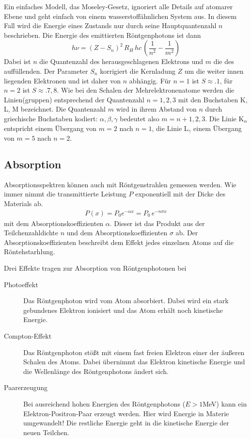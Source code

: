 Ein einfaches Modell, das Moseley-Gesetz, ignoriert alle Details auf atomarer Ebene und geht einfach von einem wasserstoffähnlichen System aus. In diesem Fall wird die Energie eines Zustands nur durch seine Hauptquantenzahl $n$ beschrieben. Die Energie des emittierten Röntgenphotons ist dann 
\begin{equation}
    h \nu = (Z - S_n)^2 \, R_H \, hc \, \left(  \frac{1}{n^2} - \frac{1}{m^2} \right)
\end{equation}
Dabei ist $n$ die Quantenzahl des herausgeschlagenen Elektrons und $m$ die des auffüllenden. Der Parameter $S_n$ korrigiert die Kernladung $Z$ um die weiter innen liegenden Elektronen und ist daher von $n$ abhängig. Für $n=1$ ist $S \approx. 1$, für $n=2$ ist $S \approx. 7,8$.
Wie bei den Schalen der Mehrelektronenatome werden die Linien(gruppen) entsprechend der Quantenzahl $n = 1, 2, 3$ mit den Buchstaben K, L, M bezeichnet. Die Quantenzahl $m$ wird in ihrem Abstand von $n$ durch griechische Buchstaben kodiert: $\alpha, \beta, \gamma$ bedeutet also $m=n + 1,2,3$. Die Linie K$_\alpha$ entspricht einem Übergang von $m=2$ nach $n=1$, die Linie L$_\gamma$ einem Übergang von $m=5$ nach $n=2$.

\subsection{Absorption}

Absorptionsspektren können auch mit Röntgenstrahlen gemessen werden. Wie immer nimmt die transmittierte Leistung $P$ exponentiell mit der Dicke des Materials ab.
\begin{eqnarray}
    P(x)  = P_0 e^{- \alpha x} = P_0 \, e^{- n \sigma  x}
\end{eqnarray}
mit dem Absorptionskoeffizienten $\alpha$. Dieser ist das Produkt aus der Teilchenzahldichte $n$ und dem Absorptionskoeffizienten $\sigma$ ab. Der Absorptionskoeffizienten beschreibt dem Effekt jedes einzelnen Atoms auf die Röntehstarhlung.

Drei Effekte tragen zur Absorption von Röntgenphotonen bei
\begin{description}
    \item[Photoeffekt] Das Röntgenphoton wird vom Atom absorbiert. Dabei wird ein stark gebundenes Elektron ionisiert und das Atom erhält noch kinetische Energie.
    \item[Compton-Effekt] Das Röntgenphoton stößt mit einem fast freien Elektron einer der äußeren Schalen des Atoms. Dabei übernimmt das Elektron kinetische Energie und die Wellenlänge des Röntgenphotons ändert sich.
    \item[Paarerzeugung] Bei ausreichend hohen Energien des Röntgenphotons ($E > 1$MeV) kann ein Elektron-Positron-Paar erzeugt werden. Hier wird Energie in Materie umgewandelt! Die restliche Energie geht in die kinetische Energie der neuen Teilchen.
\end{description}

